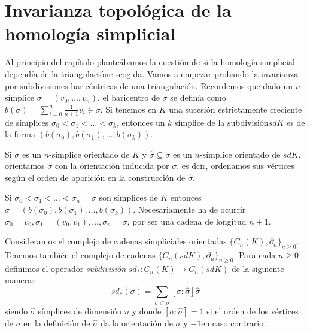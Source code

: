 \documentclass[HS.tex]{subfiles}
\begin{document}
\section{Invarianza topológica de la homología simplicial}

Al principio del capítulo planteábamos la cuestión de si la homología simplicial dependía de la triangulacióne scogida. Vamos a empezar probando la invarianza por subdivisiones baricéntricas de una triangulación. Recordemos que dado un $n$-símplice $\sigma=(v_0,\dots, v_n)$, el baricentro de $\sigma$ se definía como $b(\sigma)=\sum_{i=0}^n\frac{1}{n+1}v_i\in\mathring{\sigma}$. Si tenemos en $K$ una sucesión estrictamente creciente de símplices $\sigma_0<\sigma_1<\dots <\sigma_k$, entonces un $k$ símplice de la subdivisión$sdK$ es de la forma $(b(\sigma_0),b(\sigma_1),\dots, b(\sigma_k))$. 

Si $\sigma$ es un $n$-símplice orientado de $K$ y $\hat{\sigma}\subseteq\sigma$ es un $n$-símplice orientado de $sdK$, orientamos $\hat{\sigma}$ con la orientación inducida por $\sigma$, es dcir, ordenamos sus vértices según el orden de aparición en la construcción de $\hat{\sigma
}$. 

Si $\sigma_0<\sigma_1<\dots<\sigma_n=\sigma$ son símplices de $K$ entonces $\hat{\sigma}=(b(\sigma_0),b(\sigma_1),\dots, b(\sigma_k))$. Necesariamente ha de ocurrir $\sigma_0=v_0, \sigma_1=(v_0,v_1), \dots, \sigma_n=\sigma$, por ser una cadena de longitud $n+1$. 


Consideramos el complejo de cadenas simpliciales orientadas $\{C_n(K),\partial_n\}_{n\geq 0}$. Tenemos también el complejo de cadenas $\{C_n(sdK),\partial_n\}_{n\geq 0}$. Para cada $n\geq 0$ definimos el operador \emph{subdivisión} $sd_*:C_n(K)\to C_n(sdK)$ de la siguiente manera:
\[
sd_*(\sigma)=\sum_{\hat{\sigma}\subset\sigma}[\sigma:\hat{\sigma}]\hat{\sigma}
\]
siendo $\hat{\sigma}$ símplices de dimensión $n$ y donde $[\sigma:\hat{\sigma}]=1$ si el orden de los vértices de $\sigma$ en la definición de $\hat{\sigma}$ da la orientación de $\sigma$ y $-1$en caso contrario. 
\end{document}
